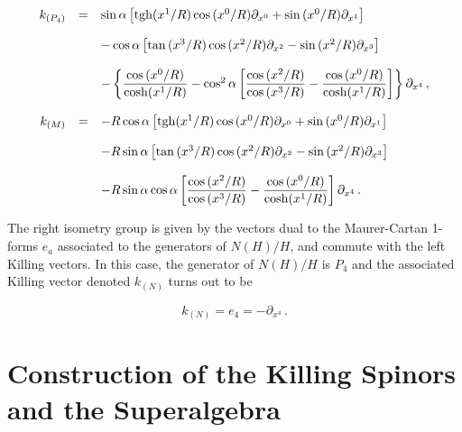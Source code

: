 \documentclass[12pt,a4paper]{article}
\begin{document}
\begin{equation}
  \begin{array}{rcl}
k_{(P_{4})} & = & 
\sin{\alpha}\left[{\rm tgh}(x^{1}/R)\cos{(x^{0}/R)}\partial_{x^{0}}
+\sin{(x^{0}/R)}\partial_{x^{1}}\right]\\
& & \\
& & 
-\cos{\alpha} \left[\tan{(x^{3}/R)}\cos{(x^{2}/R)}\partial_{x^{2}}
-\sin{(x^{2}/R)}\partial_{x^{3}} \right]\\
& & \\
& & 
-\left\{
{\displaystyle\frac{\cos{(x^{0}/R)}}{{\rm cosh}(x^{1}/R)}}
-\cos^{2}{\alpha}
\left[
{\displaystyle\frac{\cos{(x^{2}/R)}}{\cos{(x^{3}/R)}}}
-{\displaystyle\frac{\cos{(x^{0}/R)}}{{\rm cosh}{(x^{1}/R)}}}
\right] 
\right\}\partial_{x^{4}}\, ,\\
& & \\
k_{(M)} & = & 
-R\cos{\alpha}\left[{\rm tgh}(x^{1}/R)\cos{(x^{0}/R)}\partial_{x^{0}}
+\sin{(x^{0}/R)}\partial_{x^{1}}\right]\\
& & \\
& & 
-R\sin{\alpha} \left[\tan{(x^{3}/R)}\cos{(x^{2}/R)}\partial_{x^{2}}
-\sin{(x^{2}/R)}\partial_{x^{3}} \right]\\
& & \\
& & 
-R\sin{\alpha}\cos{\alpha}
\left[
{\displaystyle\frac{\cos{(x^{2}/R)}}{\cos{(x^{3}/R)}}}
-{\displaystyle\frac{\cos{(x^{0}/R)}}{{\rm cosh}{(x^{1}/R)}}}
\right] \partial_{x^{4}}\, .\\
\end{array}
\end{equation}

The right isometry group is given by the vectors dual to the
Maurer-Cartan 1-forms $e_{a}$ associated to the generators of
$N(H)/H$, and commute with the left Killing vectors. In this case, the
generator of $N(H)/H$ is $P_{4}$ and the associated Killing vector
denoted $k_{(N)}$ turns out to be

\begin{equation}
k_{(N)} = e_{4}= -\partial_{x^{4}}\, . 
\end{equation}


\section*{Construction of the  Killing  Spinors and the Superalgebra}
\end{document}
